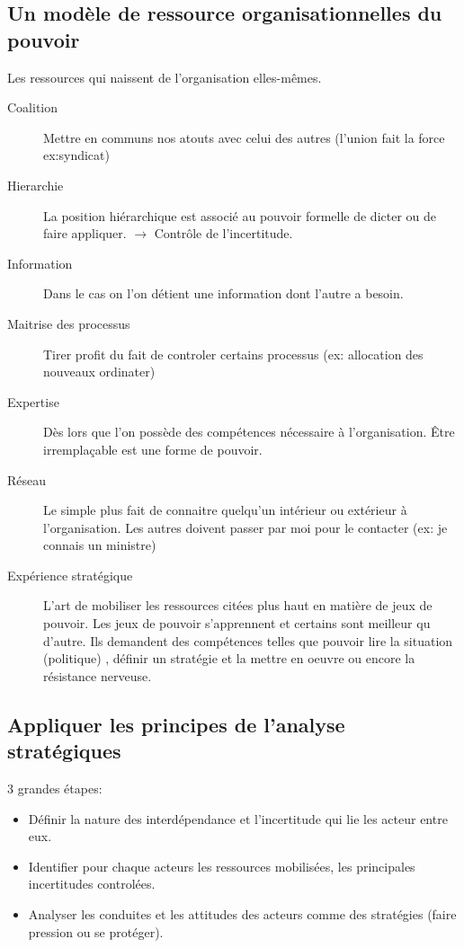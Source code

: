 \documentclass[11pt]{article} %
\begin{document}
	 \subsection{Un modèle de ressource organisationnelles du pouvoir}
	 	Les ressources qui naissent de l'organisation elles-mêmes.
	 	\begin{description}
			\item[Coalition] Mettre en communs nos atouts avec celui des autres (l'union fait la force 
			ex:syndicat)
			\item[Hierarchie] La position hiérarchique est associé au pouvoir formelle de dicter ou de faire 
			appliquer. $\to$ Contrôle de l'incertitude.
			\item[Information] Dans le cas on l'on détient une information dont l'autre a besoin.
			\item[Maitrise des processus] Tirer profit du fait de controler certains processus (ex: allocation 
			des nouveaux ordinater)
			\item[Expertise] Dès lors que l'on possède des compétences nécessaire à l'organisation. Être 
			irremplaçable est une forme de pouvoir.
			\item[Réseau] Le simple plus fait de connaitre quelqu'un intérieur ou extérieur à l'organisation.
			Les autres doivent passer par moi pour le contacter (ex: je connais un ministre)
			\item[Expérience stratégique] L'art de mobiliser les ressources citées plus haut en matière de 
			jeux de pouvoir. Les jeux de pouvoir s'apprennent et certains sont meilleur qu d'autre.
			Ils demandent des compétences telles que pouvoir lire la situation (politique) , définir un stratégie
			et la mettre en oeuvre ou encore la résistance nerveuse.
		\end{description}
	\subsection{Appliquer les principes de l'analyse stratégiques}
		3 grandes étapes:
			\begin{itemize}
				\item Définir la nature des interdépendance et l'incertitude qui lie les acteur entre eux.
				\item Identifier pour chaque acteurs les ressources mobilisées, les principales incertitudes
				controlées.
				\item Analyser les conduites et les attitudes des acteurs comme des stratégies (faire pression
				ou se protéger).
			\end{itemize}
\end{document}
